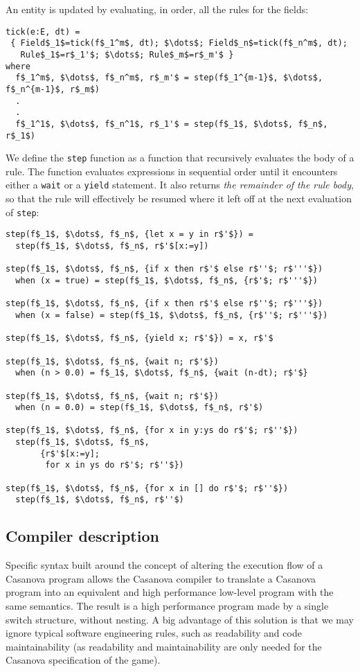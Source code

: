 An entity is updated by evaluating, in order, all the rules for the fields:
\begin{lstlisting}[mathescape]
tick(e:E, dt) =
 { Field$_1$=tick(f$_1^m$, dt); $\dots$; Field$_n$=tick(f$_n^m$, dt);
   Rule$_1$=r$_1'$; $\dots$; Rule$_m$=r$_m'$ }
where
  f$_1^m$, $\dots$, f$_n^m$, r$_m'$ = step(f$_1^{m-1}$, $\dots$, f$_n^{m-1}$, r$_m$)
  .
  .
  f$_1^1$, $\dots$, f$_n^1$, r$_1'$ = step(f$_1$, $\dots$, f$_n$, r$_1$)
\end{lstlisting}
We define the \texttt{step} function as a function that recursively evaluates the body of a rule. The function evaluates expressions in sequential order until it encounters either a \texttt{wait} or a \texttt{yield} statement. It also returns \textit{the remainder of the rule body}, so that the rule will effectively be resumed where it left off at the next evaluation of \texttt{step}:
\begin{lstlisting}[mathescape]
step(f$_1$, $\dots$, f$_n$, {let x = y in r$'$}) =
  step(f$_1$, $\dots$, f$_n$, r$'$[x:=y])

step(f$_1$, $\dots$, f$_n$, {if x then r$'$ else r$''$; r$'''$})
  when (x = true) = step(f$_1$, $\dots$, f$_n$, {r$'$; r$'''$})

step(f$_1$, $\dots$, f$_n$, {if x then r$'$ else r$''$; r$'''$})
  when (x = false) = step(f$_1$, $\dots$, f$_n$, {r$''$; r$'''$})

step(f$_1$, $\dots$, f$_n$, {yield x; r$'$}) = x, r$'$

step(f$_1$, $\dots$, f$_n$, {wait n; r$'$})
  when (n > 0.0) = f$_1$, $\dots$, f$_n$, {wait (n-dt); r$'$}

step(f$_1$, $\dots$, f$_n$, {wait n; r$'$})
  when (n = 0.0) = step(f$_1$, $\dots$, f$_n$, r$'$)

step(f$_1$, $\dots$, f$_n$, {for x in y:ys do r$'$; r$''$})
  step(f$_1$, $\dots$, f$_n$,
       {r$'$[x:=y];
        for x in ys do r$'$; r$''$})

step(f$_1$, $\dots$, f$_n$, {for x in [] do r$'$; r$''$})
  step(f$_1$, $\dots$, f$_n$, r$''$)
\end{lstlisting}

\subsection{Compiler description}
Specific syntax built around the concept of altering the execution flow of a Casanova program allows the Casanova compiler to translate a Casanova program into an equivalent and high performance low-level program with the same semantics. The result is a high performance program made by a single switch structure, without nesting.
A big advantage of this solution is that we may ignore typical software engineering rules, such as readability and code maintainability (as readability and maintainability are only needed for the Casanova specification of the game).

